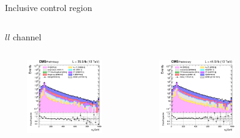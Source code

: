\documentclass[8pt]{beamer}
\begin{document}
\begin{frame}{Inclusive control region}
\begin{columns}
\begin{column}{1.09\textwidth}
\begin{block}{\centering $ll$ channel}\end{block}
\end{column}
\end{columns} \vspace{-5pt}
\begin{columns}
		\begin{column}{0.33\textwidth}
			\begin{center}
			\vspace{-8pt}
			\begin{block}{}\end{block}\vspace{10pt}
     			\includegraphics[width=1.0\textwidth, height=90pt]{figs/2016/log_cratio_inclusiveCR_ll_mll.png}
    		\end{center}		
		\end{column} 
		\begin{column}{0.33\textwidth}
			\begin{center}
			\vspace{-8pt}
			\begin{block}{}\end{block}\vspace{10pt}
     			\includegraphics[width=1.0\textwidth, height=90pt]{figs/2017/log_cratio_inclusiveCR_ll_mll.png}
    		\end{center}		
		\end{column} 
		\begin{column}{0.33\textwidth}
			\begin{center}
			\vspace{-8pt}

\end{center}
\end{column}
\end{columns}
\end{frame}
\end{document}
